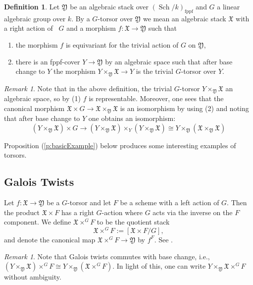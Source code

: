 \documentclass[12pt, final]{amsart}
\theoremstyle{remark}
\newtheorem{remark}[example]{Remark}
\theoremstyle{definition}
\newtheorem{definition}[example]{Definition}
\theoremstyle{plain}
\newcommand{\fX}{{\mathfrak X}}
\newcommand{\fY}{{\mathfrak Y}}
\DeclareMathOperator{\sch}{Sch}
\begin{document}
\begin{definition}\label{d:stack-torsor}
Let $\fY$ be an algebraic stack over $(\sch/k)_{\mathrm{fppf}}
$ and $G$ a linear algebraic group over $k$. By a $G$-torsor over $\fY$
we mean an algebraic stack $\fX$ with a right action of ~$G$ and a morphism $f:\fX\to \fY$ such that 
\begin{enumerate}
    \item the morphism $f$ is equivariant for the trivial action of $G$ on $\fY $, 
    \item there is an fppf-cover $Y\to \fY$ by an algebraic space such that after base change to $Y$ the morphism $Y\times_{\fY}\fX  \to Y$ is the trivial $G$-torsor over $Y$. 
\end{enumerate}    
\end{definition}

\begin{remark}\label{r:basic}
    Note that in the above definition, the trivial $G$-torsor $Y \times_\fY \fX$ an algebraic space, so by  (1)
    $f$ is representable. Moreover, one sees that the canonical morphism
    $ \fX \times G \to \fX \times_\fY \fX$ is an isomorphism by using 
     (2)
    and noting that after base change to $Y$ one obtains an isomorphism:
    $$(Y \times_\fY \fX) \times G \to  (Y \times_\fY \fX) \times_Y (Y \times_\fY \fX) \cong Y \times_\fY (\fX \times_\fY \fX)$$
\end{remark}

Proposition (\ref{p:basicExample}) below produces some interesting examples of torsors. 

\subsection{Galois Twists}\label{subsec:Galois-twist}

Let $f: \fX \to \fY$ be a $G$-torsor and let $F$ be a scheme with a left action of $G$. Then the product $\fX\times F$ has a right $G$-action 
where $G$ acts via the inverse on the $F$ component. We define $\fX\times^{G}F $ to be the quotient stack 
$$
\fX\times^{G}F := [\fX\times F/G],
$$
and denote the canonical map $\fX \times^G F \to \fY$ by $f^F$. 
See \cite[4.2]{ginot}.

\begin{remark}
    Note that Galois twists commutes with base change, i.e.,  
    $(Y\times_\fY \fX) \times^G F \cong Y \times_\fY (\fX \times^G F)$.
    In light of this, one can write 
    $Y \times_\fY \fX \times^G F$ without ambiguity.
\end{remark}
\end{document}
